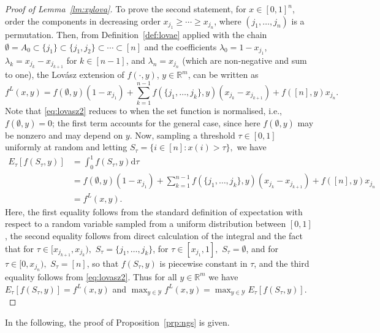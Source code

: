 \documentclass{article}
\theoremstyle{plain}
\theoremstyle{definition}
\theoremstyle{remark}
\newcommand{\R}{\mathbb{R}}
\begin{document}
\begin{proof}[Proof of Lemma~\ref{lm:xylova}]
To prove the second statement, for $x \in [0,1]^n$,
order the components in decreasing order $x_{j_1} \ge \cdots \ge x_{j_n}$,
where $(j_1,\ldots,j_n)$ is a permutation.
Then, from Definition~\ref{def:lovae} applied with the chain $\emptyset= A_0\subset\{j_1\}\subset\{j_1,j_2\}\subset\cdots\subset[n]$ and the coefficients $\lambda_0=1-x_{j_1}$, $\lambda_k=x_{j_k}-x_{j_{k+1}}$ for $k\in[n-1]$, and $\lambda_n=x_{j_n}$ (which are non-negative and sum to one),
the
Lovász extension of $f(\cdot,y)$, $y\in \R^m$, can be written as
\begin{equation}
f^L(x,y) = f(\emptyset,y)(1-x_{j_1}) +  \sum_{k=1}^{n-1} f(\{j_1,\ldots,j_k\},y)(x_{j_k} - x_{j_{k+1}}) + f([n],y)x_{j_n}.
\label{eq:lovasz2}
\end{equation}
Note that \eqref{eq:lovasz2} reduces to \citep[Def.~3.1]{bach2013learning} when the set function is normalised, i.e., $f(\emptyset,y)=0$; the first term accounts for the general case, since here $f(\emptyset,y)$ may be nonzero and may depend on $y$.
 Now, sampling
a threshold $\tau\in[0,1]$ uniformly at random and letting $S_\tau=\{i\in [n]:x(i)>\tau\},$ we have
 \begin{align*}
         E_\tau[f(S_\tau,y)] &= \int_0^1 f(S_\tau,y)\mathrm{d}\tau\\&= f(\emptyset,y)(1-x_{j_1}) + \sum_{k=1}^{n-1} f(\{j_1,\ldots,j_k\},y)(x_{j_k} - x_{j_{k+1}}) + f([n],y)x_{j_n}\\
         &=f^L(x,y).
 \end{align*}
Here, the first equality follows from the standard definition of expectation with respect to a random variable sampled from a uniform distribution between $[0,1]$ \cite{dekking2005modern}, the second equality follows from direct calculation of the integral and the
 fact that for $\tau\in[x_{j_{k+1}} , x_{j_k}),$ $S_\tau=\{j_1,\ldots,j_k\}$, for $\tau\in[x_{j_1},1],$ $S_\tau=\emptyset$, and for $\tau\in[0,x_{j_n}),$ $S_\tau=[n]$, so that $f(S_\tau,y)$ is piecewise constant in $\tau$, and the third equality follows from \eqref{eq:lovasz2}.
 Thus for all $y\in \R^m$ we have $ E_\tau[f(S_\tau,y)]=f^L(x,y)$ and $\max_{y\in\mathcal{Y}}f^L(x,y) = \max_{y\in\mathcal{Y}}E_\tau[f(S_\tau,y)].$    
\end{proof}    
In the following, the proof of Proposition~\ref{prp:ngs} is given.
\end{document}
